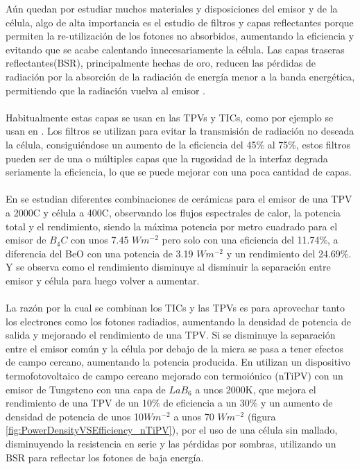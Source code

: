 Aún quedan por estudiar muchos materiales y disposiciones del emisor y de la célula, algo de alta importancia es el estudio de filtros y capas reflectantes porque permiten la re-utilización de los fotones no absorbidos, aumentando la eficiencia y evitando que se acabe calentando innecesariamente la célula. Las capas traseras reflectantes(BSR), principalmente hechas de oro, reducen las pérdidas de radiación por la absorción de la radiación de energía menor a la banda energética, permitiendo que la radiación vuelva al emisor \cite{nTPV_Review}.\\\\
Habitualmente estas capas se usan en las TPVs y TICs, como por ejemplo se usan en \cite{thermoionic_TPV_NF,modelEfficiency_NF_TPV,thermophotovoltaic_40}. Los filtros se utilizan para evitar la transmisión de radiación no deseada  la célula, consiguiéndose un aumento de la eficiencia del 45\% al 75\%, estos filtros pueden ser de una o múltiples capas que la rugosidad de la interfaz degrada seriamente la eficiencia, lo que se puede mejorar con una poca cantidad de capas\cite{multiLayerFilters}.\\\\
En \cite{differentEmitterCeramics} se estudian diferentes combinaciones de cerámicas para el emisor de una TPV a 2000\textdegree C y célula a 400\textdegree C, observando los flujos espectrales de calor, la potencia total y el rendimiento, siendo la máxima potencia por metro cuadrado para el emisor de $B_4C$ con unos 7.45 $Wm^{-2}$ pero solo con una eficiencia del 11.74\%, a diferencia del BeO con una potencia de 3.19 $Wm^{-2}$ y un rendimiento del 24.69\%. Y se observa como el rendimiento disminuye al disminuir la separación entre emisor y célula para luego volver a aumentar.\\\\
La razón por la cual se combinan los TICs y las TPVs es para aprovechar tanto los electrones como los fotones radiadios, aumentando la densidad de potencia de salida y mejorando el rendimiento de una TPV. Si se disminuye la separación entre el emisor común y la célula por debajo de la micra se pasa a tener efectos de campo cercano, aumentando la potencia producida. En \cite{thermoionic_TPV_NF} utilizan un dispositivo termofotovoltaico de campo cercano mejorado con termoiónico (nTiPV) con un emisor de Tungsteno con una capa de $LaB_6$ a unos 2000K, que mejora el rendimiento de una TPV de un 10\% de eficiencia a un 30\% y un aumento de densidad de potencia de unos 10$Wm^{-2}$ a unos 70 $Wm^{-2}$ (figura \ref{fig:PowerDensityVSEfficiency_nTiPV}), por el uso de una célula sin mallado, disminuyendo la resistencia en serie y las pérdidas por sombras, utilizando un BSR para reflectar los fotones de baja energía.\\
